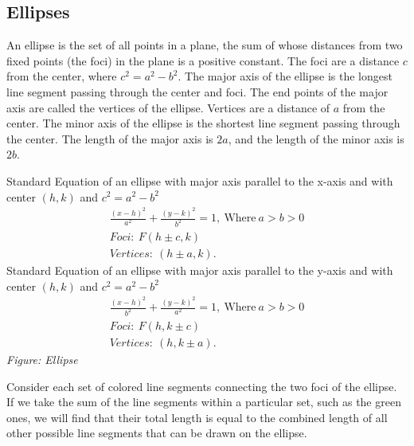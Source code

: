 \documentclass{report}
\begin{document}
    \bigbreak \noindent \bigbreak \noindent 
    \subsection{
      Ellipses
    }
    \bigbreak \noindent \bigbreak \noindent
      \smallbreak \noindent
      \begin{definition}
          An ellipse is the set of all points in a plane, the sum of whose distances from two fixed points (the foci) in the plane is a positive constant. The foci are a distance $c$ from the center, where $c^2 = a^2 - b^2$. 
        The major axis of the ellipse is the longest line segment passing through the center and foci. The end points of the major axis are called the vertices of the ellipse. Vertices are a distance of $a$ from the center. 
        The minor axis of the ellipse is the shortest line segment passing through the center. 
        The length of the major axis is $2a$, and the length of the minor axis is $2b$. 
      \end{definition}
    \bigbreak \noindent 
    Standard Equation of an ellipse with major axis parallel to the x-axis and with center $(h, k)$ and $c^2 = a^2 - b^2$
    \begin{align*}
      \frac{(x-h)^{2}}{a^{2}} + \frac{(y-k)^{2}}{b^{2}} = 1,\ \text{Where}\ a >b >0 \\
      Foci:\ F(h \pm c,k) \\
      Vertices:\ (h \pm a,k)
    .\end{align*}
    \bigbreak \noindent 
    Standard Equation of an ellipse with major axis parallel to the y-axis and with center $(h, k)$ and $c^2 = a^2 - b^2$
    \begin{align*}
      \frac{(x-h)^{2}}{b^{2}} + \frac{(y-k)^{2}}{a^{2}} = 1,\ \text{Where}\ a >b >0 \\
      Foci:\ F(h,k \pm c) \\
      Vertices:\ (h,k \pm a)
    .\end{align*}
    \pagebreak \bigbreak \noindent
    \textit{Figure: Ellipse}
      \begin{figure}[ht]
          \centering
          \label{fig:ellipse}
      \end{figure}
      \bigbreak \noindent 
      Consider each set of colored line segments connecting the two foci of the ellipse. If we take the sum of the line segments within a particular set, such as the green ones, we will find that their total length is equal to the combined length of all other possible line segments that can be drawn on the ellipse.
      \bigbreak \noindent 
      \bigbreak \noindent \bigbreak \noindent 
\end{document}

